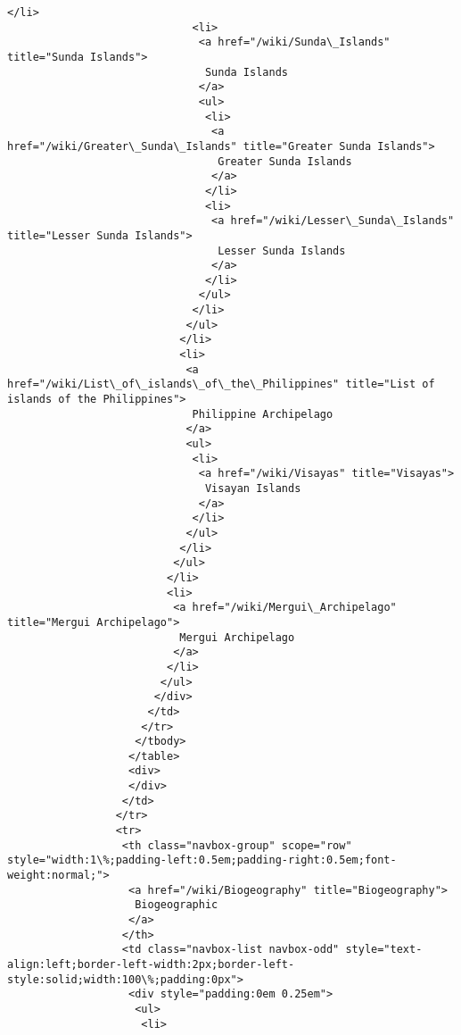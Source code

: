 \documentclass[11pt]{article}
\begin{document}
\begin{Verbatim}[commandchars=\\\{\}]
                             </li>
                             <li>
                              <a href="/wiki/Sunda\_Islands" title="Sunda Islands">
                               Sunda Islands
                              </a>
                              <ul>
                               <li>
                                <a href="/wiki/Greater\_Sunda\_Islands" title="Greater Sunda Islands">
                                 Greater Sunda Islands
                                </a>
                               </li>
                               <li>
                                <a href="/wiki/Lesser\_Sunda\_Islands" title="Lesser Sunda Islands">
                                 Lesser Sunda Islands
                                </a>
                               </li>
                              </ul>
                             </li>
                            </ul>
                           </li>
                           <li>
                            <a href="/wiki/List\_of\_islands\_of\_the\_Philippines" title="List of islands of the Philippines">
                             Philippine Archipelago
                            </a>
                            <ul>
                             <li>
                              <a href="/wiki/Visayas" title="Visayas">
                               Visayan Islands
                              </a>
                             </li>
                            </ul>
                           </li>
                          </ul>
                         </li>
                         <li>
                          <a href="/wiki/Mergui\_Archipelago" title="Mergui Archipelago">
                           Mergui Archipelago
                          </a>
                         </li>
                        </ul>
                       </div>
                      </td>
                     </tr>
                    </tbody>
                   </table>
                   <div>
                   </div>
                  </td>
                 </tr>
                 <tr>
                  <th class="navbox-group" scope="row" style="width:1\%;padding-left:0.5em;padding-right:0.5em;font-weight:normal;">
                   <a href="/wiki/Biogeography" title="Biogeography">
                    Biogeographic
                   </a>
                  </th>
                  <td class="navbox-list navbox-odd" style="text-align:left;border-left-width:2px;border-left-style:solid;width:100\%;padding:0px">
                   <div style="padding:0em 0.25em">
                    <ul>
                     <li>

\end{Verbatim}
\end{document}
